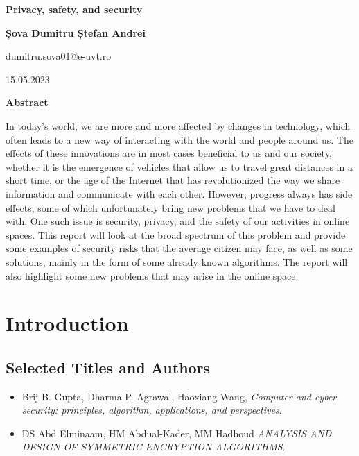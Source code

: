 \documentclass[a4paper,12pt]{report}
\begin{document}
\thispagestyle{plain}
\begin{center}
    \Large
    \textbf{Privacy, safety, and security}
        
    \vspace{0.4cm}
    \large
    \textbf{Șova Dumitru Ștefan Andrei}

    \vspace{0.4cm}
    \large
    dumitru.sova01@e-uvt.ro

    \vspace{0.4cm}
    15.05.2023
       
    \vspace{0.9cm}
    \textbf{Abstract}
\end{center}
In today's world, we are more and more affected by changes in technology, which often leads to a new way of interacting with the world and people around us. The effects of these innovations are in most cases beneficial to us and our society, whether it is the emergence of vehicles that allow us to travel great distances in a short time, or the age of the Internet that has revolutionized the way we share information and communicate with each other. However, progress always has side effects, some of which unfortunately bring new problems that we have to deal with. One such issue is security, privacy, and the safety of our activities in online spaces. This report will look at the broad spectrum of this problem and provide some examples of security risks that the average citizen may face, as well as some solutions, mainly in the form of some already known algorithms. The report will also highlight some new problems that may arise in the online space.

\newpage
\normalsize{}

\chapter{Introduction}

\section{Selected Titles and Authors}
\begin{itemize}

\item Brij B. Gupta, Dharma P. Agrawal, Haoxiang Wang, \textit{Computer and cyber security: principles, algorithm, applications, and perspectives}. 

\item DS Abd Elminaam, HM Abdual-Kader, MM Hadhoud  \textit{ANALYSIS AND DESIGN OF SYMMETRIC ENCRYPTION ALGORITHMS}.

\end{itemize}
\end{document}
